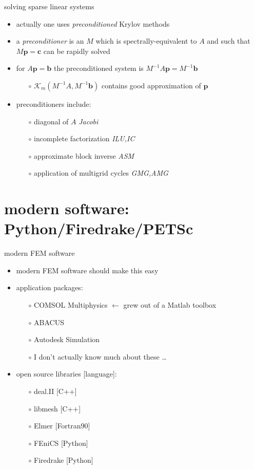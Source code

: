 \documentclass[hide notes,intlimits,usenames,dvipsnames]{beamer}
\newcommand{\bb}{\mathbf{b}}
\newcommand{\bc}{\mathbf{c}}
\newcommand{\bp}{\mathbf{p}}
\begin{document}
\begin{frame}{solving sparse linear systems}
\begin{itemize}
\item actually one uses \emph{preconditioned} Krylov methods
\item a \emph{preconditioner} is an $M$ which is spectrally-equivalent to $A$ and such that $M\bp=\bc$ can be rapidly solved
\item for $A\bp=\bb$ the preconditioned system is $M^{-1} A \bp = M^{-1} \bb$
    \begin{itemize}
    \item[$\circ$] $\mathcal{K}_m(M^{-1} A,M^{-1} \bb)$ contains good approximation of $\bp$
    \end{itemize}
\item preconditioners include:
    \begin{itemize}
    \item[$\circ$] diagonal of $A$ \hfill \emph{Jacobi}
    \item[$\circ$] incomplete factorization \hfill \emph{ILU,IC}
    \item[$\circ$] approximate block inverse \hfill \emph{ASM}
    \item[$\circ$] application of multigrid cycles \hfill \emph{GMG,AMG}
    \end{itemize}
\end{itemize}
\end{frame}


\section{modern software: Python/Firedrake/PETSc}

\begin{frame}{modern FEM software}

\begin{itemize}
\item modern FEM software should make this easy
\item application packages:
    \begin{itemize}
    \item[$\circ$] COMSOL Multiphysics  \hfill $\leftarrow$ grew out of a Matlab toolbox
    \item[$\circ$] ABACUS
    \item[$\circ$] Autodesk Simulation
    \item[$\circ$] I don't actually know much about these \dots
    \end{itemize}
\item open source libraries [language]:
    \begin{itemize}
    \item[$\circ$] deal.II [C++]
    \item[$\circ$] libmesh [C++]
    \item[$\circ$] Elmer [Fortran90]
    \item[$\circ$] FEniCS [Python]
    \item[$\circ$] Firedrake [Python]
    \end{itemize}

\end{itemize}
\end{frame}
\end{document}
